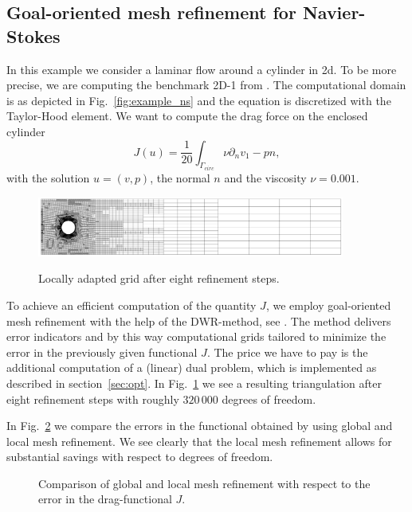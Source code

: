 \documentclass[smallextended]{svjour3}       %
\numberwithin{equation}{section}
\begin{document}
\subsection{Goal-oriented mesh refinement for Navier-Stokes}
In this example we consider a laminar flow around a cylinder in 2d. To be more precise, we are computing the benchmark 2D-1 from \cite{TuSchae96}. The computational domain is as depicted in Fig.~\ref{fig:example_ns} and the equation is discretized with the Taylor-Hood  element. We want to compute the drag force on the enclosed cylinder
\begin{equation}
J(u) = \frac 1 {20} \int_{\Gamma_{circ}} \nu\partial_nv _1 - pn,
\end{equation}
with the solution $u = (v,p)$, the normal $n$ and the viscosity $\nu = 0.001$.
\begin{figure}[hbt]
\centering
{\includegraphics[width=0.9\textwidth]{Pictures/local_grid_NS.png}}
\caption{Locally adapted grid after eight refinement steps.}
\label{fig:NS_local_grid}
\end{figure}
To achieve an efficient computation of the quantity $J$, we employ goal-oriented mesh refinement with the help of the DWR-method, see \cite{BeRa96}. The method delivers error indicators and by this way computational grids tailored to minimize the error in the previously given functional $J$. The price we have to pay is the additional computation of a (linear) dual problem, which is implemented as described in section~\ref{sec:opt}. In Fig.~\ref{fig:NS_local_grid} we see a resulting triangulation after eight refinement steps with roughly $320\,000$ degrees of freedom.

In Fig.~\ref{fig:NS_comparison} we compare the errors in the functional obtained by using global and local mesh refinement. We see clearly that the local mesh refinement allows for substantial savings with respect to degrees of freedom.

\begin{figure}[hbt]
\centering
\resizebox{0.5\textwidth}{!}{}
\caption{Comparison of global and local mesh refinement with respect to the error in the drag-functional $J$.}
\label{fig:NS_comparison}
\end{figure}
\end{document}
